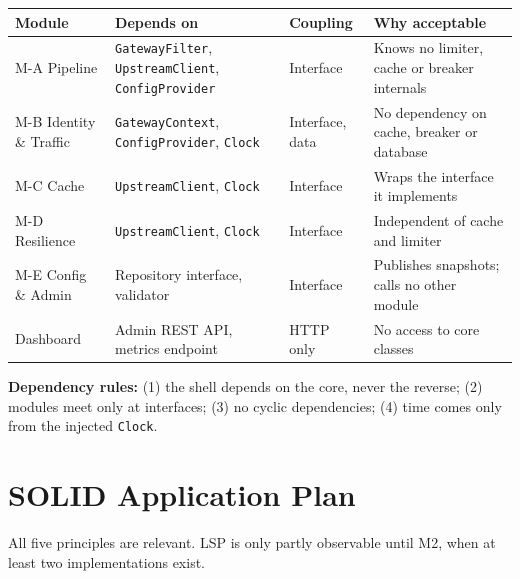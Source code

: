 \documentclass[12pt,a4paper]{article}
\newcommand{\cls}[1]{\nolinkurl{#1}}
\begin{document}
\begingroup
\small
\setlength{\tabcolsep}{4pt}
\begin{tabular}{L{2.8cm} L{4.4cm} L{2.2cm} L{4.4cm}}
\toprule
\textbf{Module} & \textbf{Depends on} & \textbf{Coupling} & \textbf{Why acceptable} \\
\midrule
M-A Pipeline & \cls{GatewayFilter}, \cls{UpstreamClient}, \cls{ConfigProvider} & Interface & Knows no limiter, cache or breaker internals \\
M-B Identity \& Traffic & \cls{GatewayContext}, \cls{ConfigProvider}, \cls{Clock} & Interface, data & No dependency on cache, breaker or database \\
M-C Cache & \cls{UpstreamClient}, \cls{Clock} & Interface & Wraps the interface it implements \\
M-D Resilience & \cls{UpstreamClient}, \cls{Clock} & Interface & Independent of cache and limiter \\
M-E Config \& Admin & Repository interface, validator & Interface & Publishes snapshots; calls no other module \\
Dashboard & Admin REST API, metrics endpoint & HTTP only & No access to core classes \\
\bottomrule
\end{tabular}
\endgroup

\textbf{Dependency rules:} (1) the shell depends on the core, never the reverse; (2) modules meet only at interfaces; (3) no cyclic dependencies; (4) time comes only from the injected \cls{Clock}.

\section{SOLID Application Plan}
\label{sec:solid}
All five principles are relevant. LSP is only partly observable until M2, when at least two implementations exist.
\end{document}
